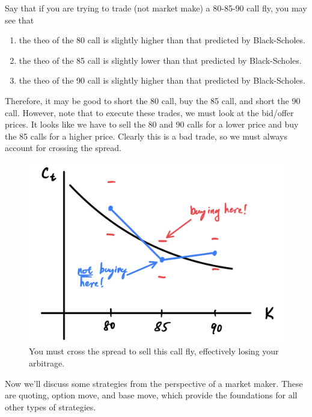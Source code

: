 \documentclass{article}
\begin{document}
    \begin{example}
      Say that if you are trying to trade (not market make) a 80-85-90 call fly, you may see that 
      \begin{enumerate}
        \item the theo of the 80 call is slightly higher than that predicted by Black-Scholes. 
        \item the theo of the 85 call is slightly lower than that predicted by Black-Scholes. 
        \item the theo of the 90 call is slightly higher than that predicted by Black-Scholes. 
      \end{enumerate}
      Therefore, it may be good to short the 80 call, buy the 85 call, and short the 90 call. However, note that to execute these trades, we must look at the bid/offer prices. It looks like we have to sell the 80 and 90 calls for a lower price and buy the 85 calls for a higher price. Clearly this is a bad trade, so we must always account for crossing the spread. 

      \begin{figure}[H]
        \centering 
        \includegraphics[scale=0.4]{img/call_fly_cross_spread.png}
        \caption{You must cross the spread to sell this call fly, effectively losing your arbitrage. } 
        \label{fig:call_fly_cross_spread}
      \end{figure}
    \end{example}
    
    Now we'll discuss some strategies from the perspective of a market maker. These are quoting, option move, and base move, which provide the foundations for all other types of strategies.
\end{document}
